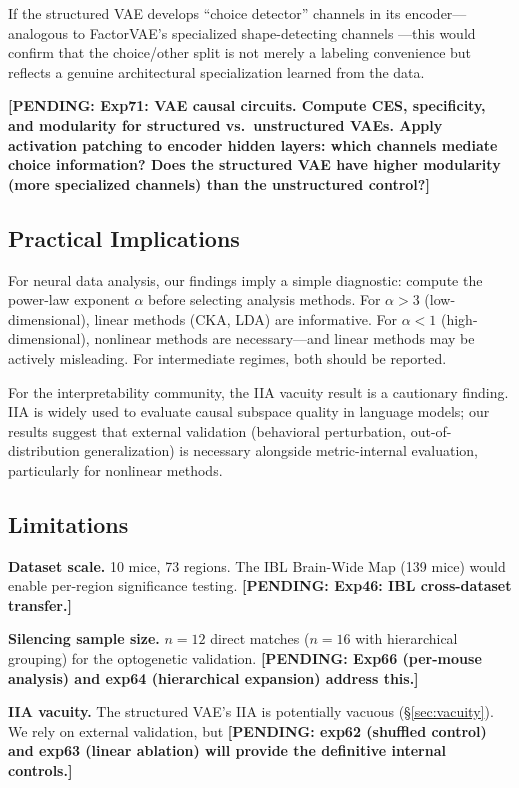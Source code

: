 \documentclass{article}
\newcommand{\pending}[1]{\textcolor{red!70!black}{\textbf{[PENDING: #1]}}}
\begin{document}
If the structured VAE develops ``choice detector'' channels in its encoder---analogous to FactorVAE's specialized shape-detecting channels \citep{martinez2025vae_circuits}---this would confirm that the choice/other split is not merely a labeling convenience but reflects a genuine architectural specialization learned from the data.

\pending{Exp71: VAE causal circuits. Compute CES, specificity, and modularity for structured vs.\ unstructured VAEs. Apply activation patching to encoder hidden layers: which channels mediate choice information? Does the structured VAE have higher modularity (more specialized channels) than the unstructured control?}

\subsection{Practical Implications}

For neural data analysis, our findings imply a simple diagnostic: compute the power-law exponent $\alpha$ before selecting analysis methods. For $\alpha > 3$ (low-dimensional), linear methods (CKA, LDA) are informative. For $\alpha < 1$ (high-dimensional), nonlinear methods are necessary---and linear methods may be actively misleading. For intermediate regimes, both should be reported.

For the interpretability community, the IIA vacuity result is a cautionary finding. IIA is widely used to evaluate causal subspace quality in language models; our results suggest that external validation (behavioral perturbation, out-of-distribution generalization) is necessary alongside metric-internal evaluation, particularly for nonlinear methods.

\subsection{Limitations}

\textbf{Dataset scale.} 10 mice, 73 regions. The IBL Brain-Wide Map (139 mice) would enable per-region significance testing. \pending{Exp46: IBL cross-dataset transfer.}

\textbf{Silencing sample size.} $n = 12$ direct matches ($n = 16$ with hierarchical grouping) for the optogenetic validation. \pending{Exp66 (per-mouse analysis) and exp64 (hierarchical expansion) address this.}

\textbf{IIA vacuity.} The structured VAE's IIA is potentially vacuous (\S\ref{sec:vacuity}). We rely on external validation, but \pending{exp62 (shuffled control) and exp63 (linear ablation) will provide the definitive internal controls.}
\end{document}
